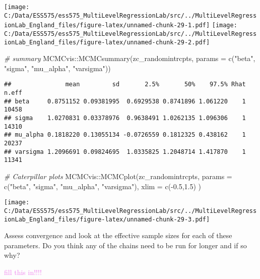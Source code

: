 \documentclass[
]{article}
\newenvironment{Shaded}{\begin{snugshade}}{\end{snugshade}}
\newcommand{\AttributeTok}[1]{\textcolor[rgb]{0.77,0.63,0.00}{#1}}
\newcommand{\CommentTok}[1]{\textcolor[rgb]{0.56,0.35,0.01}{\textit{#1}}}
\newcommand{\FloatTok}[1]{\textcolor[rgb]{0.00,0.00,0.81}{#1}}
\newcommand{\FunctionTok}[1]{\textcolor[rgb]{0.00,0.00,0.00}{#1}}
\newcommand{\NormalTok}[1]{#1}
\newcommand{\SpecialCharTok}[1]{\textcolor[rgb]{0.00,0.00,0.00}{#1}}
\newcommand{\StringTok}[1]{\textcolor[rgb]{0.31,0.60,0.02}{#1}}
\begin{document}
\texttt{[image: C:/Data/ESS575/ess575\_MultiLevelRegressionLab/src/../MultiLevelRegressionLab\_England\_files/figure-latex/unnamed-chunk-29-1.pdf]}
\texttt{[image: C:/Data/ESS575/ess575\_MultiLevelRegressionLab/src/../MultiLevelRegressionLab\_England\_files/figure-latex/unnamed-chunk-29-2.pdf]}

\begin{Shaded}
\begin{Highlighting}[]
\CommentTok{\# summary}
\NormalTok{MCMCvis}\SpecialCharTok{::}\FunctionTok{MCMCsummary}\NormalTok{(zc\_randomintrcpts, }\AttributeTok{params =} \FunctionTok{c}\NormalTok{(}\StringTok{"beta"}\NormalTok{, }\StringTok{"sigma"}\NormalTok{, }\StringTok{"mu\_alpha"}\NormalTok{, }\StringTok{"varsigma"}\NormalTok{))}
\end{Highlighting}
\end{Shaded}

\begin{verbatim}
##               mean         sd       2.5%       50%    97.5% Rhat n.eff
## beta     0.8751152 0.09381995  0.6929538 0.8741896 1.061220    1 10458
## sigma    1.0270831 0.03378976  0.9638491 1.0262135 1.096306    1 14310
## mu_alpha 0.1818220 0.13055134 -0.0726559 0.1812325 0.438162    1 20237
## varsigma 1.2096691 0.09824695  1.0335825 1.2048714 1.417870    1 11341
\end{verbatim}

\begin{Shaded}
\begin{Highlighting}[]
\CommentTok{\# Caterpillar plots}
\NormalTok{MCMCvis}\SpecialCharTok{::}\FunctionTok{MCMCplot}\NormalTok{(zc\_randomintrcpts, }\AttributeTok{params =} \FunctionTok{c}\NormalTok{(}\StringTok{"beta"}\NormalTok{, }\StringTok{"sigma"}\NormalTok{, }\StringTok{"mu\_alpha"}\NormalTok{, }\StringTok{"varsigma"}\NormalTok{), }\AttributeTok{xlim =} \FunctionTok{c}\NormalTok{(}\SpecialCharTok{{-}}\FloatTok{0.5}\NormalTok{,}\FloatTok{1.5}\NormalTok{) )}
\end{Highlighting}
\end{Shaded}

\texttt{[image: C:/Data/ESS575/ess575\_MultiLevelRegressionLab/src/../MultiLevelRegressionLab\_England\_files/figure-latex/unnamed-chunk-29-3.pdf]}

Assess convergence and look at the effective sample sizes for each of
these parameters. Do you think any of the chains need to be run for
longer and if so why?

\textcolor{violet}{fill this in!!!!}
\end{document}
